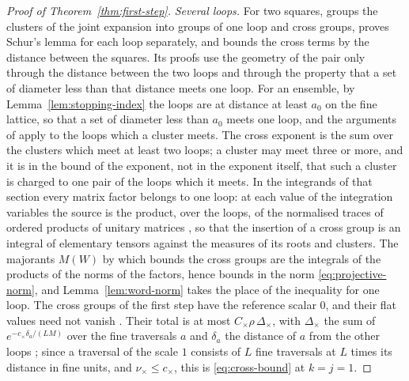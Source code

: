 \documentclass[11pt]{preprint}
\numberwithin{equation}{section}
\theoremstyle{definition}
\theoremstyle{remark}
\theoremstyle{plain}
\begin{document}
\begin{proof}[Proof of Theorem~\ref{thm:first-step}]
\emph{Several loops.} For two squares, \cite[Section~10]{WilsonFirstStep} groups the clusters of the joint expansion into groups of one loop and cross groups, proves Schur's lemma for each loop separately, and bounds the cross terms by the distance between the squares. Its proofs use the geometry of the pair only through the distance between the two loops and through the property that a set of diameter less than that distance meets one loop. For an ensemble, by Lemma~\ref{lem:stopping-index} the loops are at distance at least $a_0$ on the fine lattice, so that a set of diameter less than $a_0$ meets one loop, and the arguments of \cite[Section~10]{WilsonFirstStep} apply to the loops which a cluster meets. The cross exponent is the sum over the clusters which meet at least two loops; a cluster may meet three or more, and it is in the bound of the exponent, not in the exponent itself, that such a cluster is charged to one pair of the loops which it meets. In the integrands of that section every matrix factor belongs to one loop: at each value of the integration variables the source is the product, over the loops, of the normalised traces of ordered products of unitary matrices \cite[Lemma~10.4]{WilsonFirstStep}, so that the insertion of a cross group is an integral of elementary tensors against the measures of its roots and clusters. The majorants $M(W)$ by which \cite[Section~10]{WilsonFirstStep} bounds the cross groups are the integrals of the products of the norms of the factors, hence bounds in the norm \eqref{eq:projective-norm}, and Lemma~\ref{lem:word-norm} takes the place of the inequality for one loop. The cross groups of the first step have the reference scalar $0$, and their flat values need not vanish \cite[Section~10.3]{WilsonFirstStep}. Their total is at most $C_\times\rho\,\Delta_\times$, with $\Delta_\times$ the sum of $e^{-c_\times\delta_a/(LM)}$ over the fine traversals $a$ and $\delta_a$ the distance of $a$ from the other loops \cite[Lemma~10.7(a)]{WilsonFirstStep}; since a traversal of the scale $1$ consists of $L$ fine traversals at $L$ times its distance in fine units, and $\nu_\times \leq c_\times$, this is \eqref{eq:cross-bound} at $k = j = 1$.


\end{proof}
\end{document}
